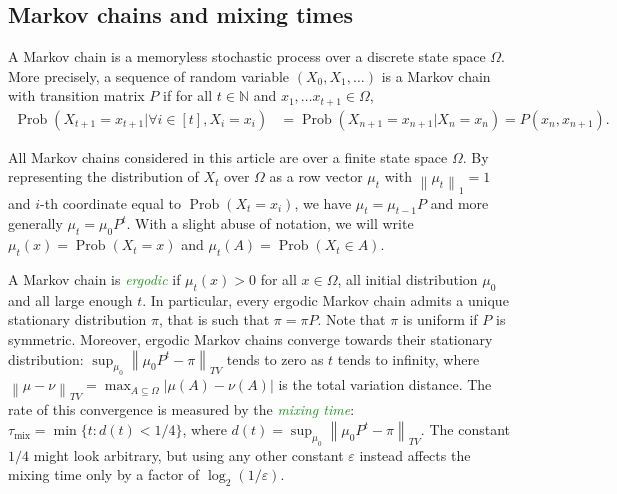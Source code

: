 \documentclass[11pt,a4paper]{article}
\theoremstyle{definition}
\newcommand{\eps}{\varepsilon}
\newcommand{\norm}[1]{\left\lVert#1\right\rVert}
\DeclareMathOperator{\Prob}{Prob}
\DeclareMathOperator{\mix}{mix}
\newcommand{\defin}[1]{\emph{\textcolor{ForestGreen}{#1}}}
\begin{document}
\subsection{Markov chains and mixing times}\label{ssec:Markov}
A Markov chain is a memoryless stochastic process over a discrete state space
$\Omega$. More precisely, a sequence of random variable $(X_0, X_1, \dots)$ is a
Markov chain with transition matrix $P$ if for all $t \in \mathbb{N}$ and $x_1,
\dots x_{t+1} \in \Omega$,
\begin{align*}
  \Prob(X_{t+1}  = x_{t+1} | \forall i \in [t], X_i = x_i) 
  &= \Prob(X_{n+1} = x_{n+1}|X_n=x_n)
  = P(x_{n},x_{n+1}).
\end{align*}

All Markov chains considered in this article are over a finite state space
$\Omega$. By representing the distribution of $X_t$ over $\Omega$ as a row
vector $\mu_t$ with $\norm{\mu_t}_1 = 1$ and $i$-th coordinate equal to
$\Prob(X_t = x_i)$, we have $\mu_t = \mu_{t-1}P$ and more generally $\mu_t =
\mu_0P^t$. With a slight abuse of notation, we will write $\mu_t(x) =
\Prob(X_t=x)$ and $\mu_t(A) = \Prob(X_t \in A)$.

A Markov chain is \defin{ergodic} if $\mu_t(x) > 0$ for all $x \in \Omega$, all
initial distribution $\mu_0$ and all large enough $t$. In particular, every
ergodic Markov chain admits a unique stationary distribution $\pi$, that is such
that $\pi = \pi P$. Note that $\pi$ is uniform if $P$ is symmetric. Moreover,
ergodic Markov chains converge towards their stationary distribution:
$\sup_{\mu_0}\norm{\mu_0P^t - \pi}_{TV}$ tends to zero as $t$ tends to infinity,
where $\norm{\mu - \nu}_{TV} = \max_{A \subseteq \Omega} |\mu(A) - \nu(A)|$ is
the total variation distance. The rate of this convergence is measured by the
\defin{mixing time}: $\tau_{\mix} = \min\{t: d(t) < 1/4\}$, where $d(t)=
\sup_{\mu_0}\norm{\mu_0P^t - \pi}_{TV}$. The constant $1/4$ might look
arbitrary, but using any other constant $\eps$ instead affects the mixing time
only by a factor of $\log_2(1/\eps)$.
\end{document}
